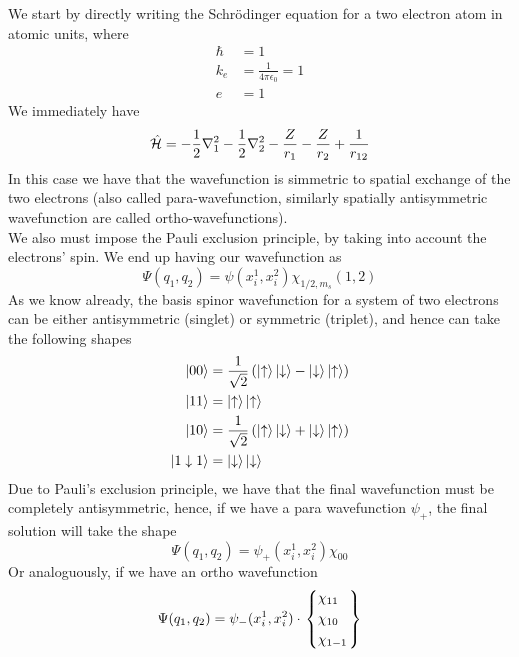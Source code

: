 \documentclass[../qm.tex]{subfiles}
\begin{document}
	We start by directly writing the Schrödinger equation for a two electron atom in atomic units, where
	\begin{equation*}
		\begin{aligned}
			\hbar&=1\\
			k_e&=\frac{1}{4\pi\epsilon_0}=1\\
			e&=1
		\end{aligned}
	\end{equation*}
	We immediately have
	\begin{equation}
		\hat{\mathcal{H}}=-\frac{1}{2}\nabla_1^2-\frac{1}{2}\nabla_2^2-\frac{Z}{r_1}-\frac{Z}{r_2}+\frac{1}{r_{12}}
		\label{eq:twoelectronham}
	\end{equation}
	In this case we have that the wavefunction is simmetric to spatial exchange of the two electrons (also called para-wavefunction, similarly spatially antisymmetric wavefunction are called ortho-wavefunctions).\\
	We also must impose the Pauli exclusion principle, by taking into account the electrons' spin. We end up having our wavefunction as
	\begin{equation}
		\Psi(q_1,q_2)=\psi(x_i^1,x_i^2)\chi_{1/2,m_s}(1,2)
		\label{eq:wavefunctiontwoeminus}
	\end{equation}
	As we know already, the basis spinor wavefunction for a system of two electrons can be either antisymmetric (singlet) or symmetric (triplet), and hence can take the following shapes
	\begin{equation*}
		\begin{aligned}
			\ket{00}&=\frac{1}{\sqrt{2}}\left( \ket{\uparrow}\ket{\downarrow}-\ket{\downarrow}\ket{\uparrow} \right)\\
			\ket{11}&=\ket{\uparrow}\ket{\uparrow}\\
			\ket{10}&=\frac{1}{\sqrt{2}}\left( \ket{\uparrow}\ket{\downarrow}+\ket{\downarrow}\ket{\uparrow} \right)\\
			\ket{1\downarrow1}&=\ket{\downarrow}\ket{\downarrow}
		\end{aligned}
	\end{equation*}
	Due to Pauli's exclusion principle, we have that the final wavefunction must be completely antisymmetric, hence, if we have a para wavefunction $\psi_+$, the final solution will take the shape
	\begin{equation}
		\Psi(q_1,q_2)=\psi_+(x_i^1,x_i^2)\chi_{00}
		\label{eq:parawave}
	\end{equation}
	Or analoguously, if we have an ortho wavefunction
	\begin{equation}
		\Psi(q_1,q_2)=\psi_-(x_i^1,x_i^2)\cdot\left.\begin{dcases}\chi_{11}\\\chi_{10}\\\chi_{1-1}\end{dcases}\right\}
		\label{eq:orthowave}
	\end{equation}
\end{document}

